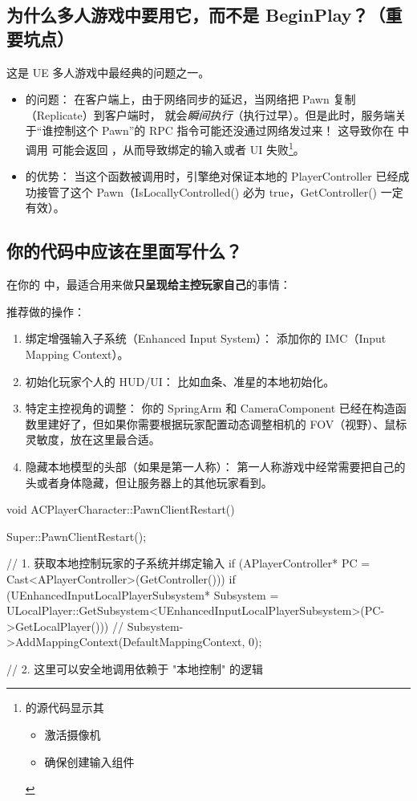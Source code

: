 \subsection{为什么多人游戏中要用它，而不是 BeginPlay？（重要坑点）}
这是 UE 多人游戏中最经典的问题之一。
\begin{itemize}
	\item {} 的问题： 在客户端上，由于网络同步的延迟，当网络把 Pawn 复制（Replicate）到客户端时， 就会\emph{瞬间执行}（执行过早）。但是此时，服务端关于“谁控制这个 Pawn”的 RPC 指令可能还没通过网络发过来！ 这导致你在  中调用  可能会返回 ，从而导致绑定的输入或者 UI 失败\footnote{的源代码显示其
		\begin{itemize}
			\item 激活摄像机
			\item 确保创建输入组件
	\end{itemize}}。
	
	\item {} 的优势： 当这个函数被调用时，引擎绝对保证本地的 PlayerController 已经成功接管了这个 Pawn（IsLocallyControlled() 必为 true，GetController() 一定有效）。
\end{itemize}
\subsection{你的代码中应该在里面写什么？}
在你的  中，最适合用来做\textbf{只呈现给主控玩家自己}的事情：

推荐做的操作：
\begin{enumerate}
	\item 绑定增强输入子系统（Enhanced Input System）： 添加你的 IMC（Input Mapping Context）。
	\item 初始化玩家个人的 HUD/UI： 比如血条、准星的本地初始化。
	\item 特定主控视角的调整： 你的 SpringArm 和 CameraComponent 已经在构造函数里建好了，但如果你需要根据玩家配置动态调整相机的 FOV（视野）、鼠标灵敏度，放在这里最合适。
	\item 隐藏本地模型的头部（如果是第一人称）： 第一人称游戏中经常需要把自己的头或者身体隐藏，但让服务器上的其他玩家看到。
\end{enumerate}
\begin{code}[caption={伪代码示例}]
	void ACPlayerCharacter::PawnClientRestart()
	{
		Super::PawnClientRestart();
		
		// 1. 获取本地控制玩家的子系统并绑定输入
		if (APlayerController* PC = Cast<APlayerController>(GetController()))
		{
			if (UEnhancedInputLocalPlayerSubsystem* Subsystem = ULocalPlayer::GetSubsystem<UEnhancedInputLocalPlayerSubsystem>(PC->GetLocalPlayer()))
			{
				// Subsystem->AddMappingContext(DefaultMappingContext, 0);
			}
		}
		
		// 2. 这里可以安全地调用依赖于 "本地控制" 的逻辑
	}
\end{code}
